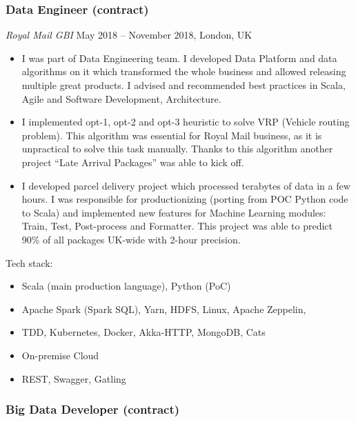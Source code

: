 \documentclass[
]{rss}
\providecommand{\tightlist}{%
  \setlength{\itemsep}{0pt}\setlength{\parskip}{0pt}}
\begin{document}
\begin{resume}
\hypertarget{data-engineer-contract}{%
\subsubsection{Data Engineer (contract)}\label{data-engineer-contract}}

\emph{Royal Mail \textbar{} GBI} May 2018 -- November 2018, London, UK

\begin{itemize}
\item
  I was part of Data Engineering team. I developed Data Platform and
  data algorithms on it which transformed the whole business and allowed
  releasing multiple great products. I advised and recommended best
  practices in Scala, Agile and Software Development, Architecture.
\item
  I implemented opt-1, opt-2 and opt-3 heuristic to solve VRP (Vehicle
  routing problem). This algorithm was essential for Royal Mail
  business, as it is unpractical to solve this task manually. Thanks to
  this algorithm another project ``Late Arrival Packages'' was able to
  kick off.
\item
  I developed parcel delivery project which processed terabytes of data
  in a few hours. I was responsible for productionizing (porting from
  POC Python code to Scala) and implemented new features for Machine
  Learning modules: Train, Test, Post-process and Formatter. This
  project was able to predict 90\% of all packages UK-wide with 2-hour
  precision.
\end{itemize}

Tech stack:

\begin{itemize}
\tightlist
\item
  Scala (main production language), Python (PoC)
\item
  Apache Spark (Spark SQL), Yarn, HDFS, Linux, Apache Zeppelin,
\item
  TDD, Kubernetes, Docker, Akka-HTTP, MongoDB, Cats
\item
  On-premise Cloud
\item
  REST, Swagger, Gatling
\end{itemize}

\hypertarget{big-data-developer-contract}{%
\subsubsection{Big Data Developer
(contract)}\label{big-data-developer-contract}}


\end{resume}
\end{document}
